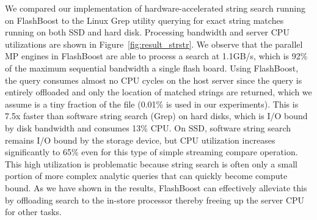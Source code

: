 We compared our implementation of hardware-accelerated string search running on
FlashBoost to the Linux Grep utility querying for exact string matches running
on both SSD and hard disk. Processing bandwidth and server CPU utilizations are
shown in Figure~\ref{fig:result_strstr}. We observe that the parallel MP
engines in FlashBoost are able to process a search at 1.1GB/s, which is 92\% of
the maximum sequential bandwidth a single flash board. Using FlashBoost, the
query consumes almost no CPU cycles on the host server since the query is
entirely offloaded and only the location of matched strings are returned, which
we assume is a tiny fraction of the file (0.01\% is used in our experiments).
This is 7.5x faster than software string search (Grep) on hard disks, which is
I/O bound by disk bandwidth and consumes 13\% CPU. On SSD, software string
search remains I/O bound by the storage device, but CPU utilization increases
significantly to 65\% even for this type of simple streaming compare operation.
This high utilization is problematic because string search is often only a small portion 
of more complex analytic queries that can quickly become compute bound.  As we
have shown in the results, FlashBoost can effectively alleviate this by
offloading search to the in-store processor thereby freeing up the server CPU
for other tasks. 
 

